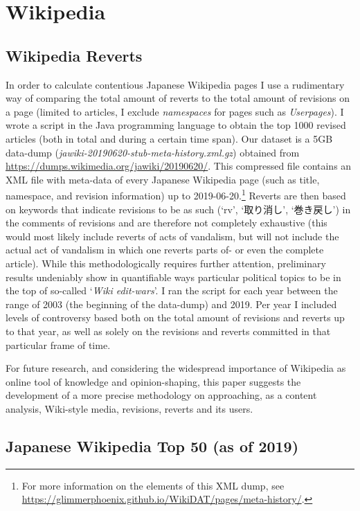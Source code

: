 \documentclass[10pt,british,A4paper,twoside]{memoir}
\begin{document}
\section{Wikipedia}\label{wikipedia}

\subsection{Wikipedia Reverts}\label{wikipedia-reverts}

In order to calculate contentious Japanese Wikipedia pages I use a
rudimentary way of comparing the total amount of reverts to the total
amount of revisions on a page (limited to articles, I exclude
\emph{namespaces} for pages such as \emph{Userpages}). I wrote a script
in the Java programming language to obtain the top 1000 revised articles
(both in total and during a certain time span). Our dataset is a 5GB
data-dump (\emph{jawiki-20190620-stub-meta-history.xml.gz}) obtained
from \url{https://dumps.wikimedia.org/jawiki/20190620/}. This compressed
file contains an XML file with meta-data of every Japanese Wikipedia
page (such as title, namespace, and revision information) up to
2019-06-20.\footnote{For more information on the elements of this XML
  dump, see
  \url{https://glimmerphoenix.github.io/WikiDAT/pages/meta-history/}.}
Reverts are then based on keywords that indicate revisions to be as such
(`rv', `取り消し', `巻き戻し') in the comments of revisions and are
therefore not completely exhaustive (this would most likely include
reverts of acts of vandalism, but will not include the actual act of
vandalism in which one reverts parts of- or even the complete article).
While this methodologically requires further attention, preliminary
results undeniably show in quantifiable ways particular political topics
to be in the top of so-called `\emph{Wiki edit-wars}'. I ran the script
for each year between the range of 2003 (the beginning of the data-dump)
and 2019. Per year I included levels of controversy based both on the
total amount of revisions and reverts up to that year, as well as solely
on the revisions and reverts committed in that particular frame of time.

For future research, and considering the widespread importance of
Wikipedia as online tool of knowledge and opinion-shaping, this paper
suggests the development of a more precise methodology on approaching,
as a content analysis, Wiki-style media, revisions, reverts and its
users.

\subsection{Japanese Wikipedia Top 50 (as of
2019)}\label{japanese-wikipedia-top-50-as-of-2019}
\end{document}
